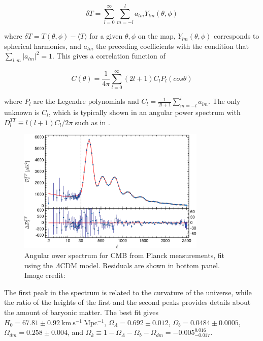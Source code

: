 \begin{equation}
\delta T = \sum\limits_{l=0}^{\infty} \sum\limits_{m=-l}^{l} a_{lm}Y_{lm}(\theta, \phi)
\end{equation}

\noindent where $\delta T = T(\theta, \phi) - \langle T \rangle$ for a given $\theta , \phi$
on the map, $Y_{lm}(\theta, \phi)$ corresponds to spherical harmonics, and $a_{lm}$ the preceding coefficients
with the condition that $\sum\limits_{l,m} |a_{lm}|^{2} = 1$.  This gives a correlation function of

\begin{equation}
C(\theta) = \frac{1}{4 \pi} \sum\limits_{l=0}^{\infty} (2l + 1) C_{l} P_{l}(cos \theta)
\end{equation}

\noindent where $P_{l}$ are the Legendre polynomials and $C_{l} = \frac{1}{2l + 1} \sum\limits_{m=-l}^{l} a_{lm}$.  The
only unknown is $C_{l}$, which is typically shown in an angular power spectrum with
$D_{l}^{TT} \equiv l(l+1)C_{l}/2\pi$ such as in .

\begin{figure}
	\includegraphics[width=0.8\textwidth]{cmb_power_spectrum}
	\centering
	\caption{Angular ower spectrum for CMB from Planck measurements, fit using the $\Lambda$CDM model.  Residuals
	are shown in bottom panel.  Image credit: }
	\label{fig:cmb_power_spectrum}
\end{figure}

The first peak in the spectrum is related to the curvature of the universe, while the ratio of the heights of the
first and the second peaks provides details about the amount of baryonic matter.  The best fit gives
$H_{0} = 67.81 \pm 0.92\ \mathrm{km\ s^{-1}\ Mpc^{-1}}$, $\Omega_{\Lambda} = 0.692 \pm 0.012$,
$\Omega_{b} = 0.0484 \pm 0.0005$, $\Omega_{dm} = 0.258 \pm 0.004$, and
$\Omega_{k} \equiv 1 - \Omega_{\Lambda} - \Omega_{b} - \Omega_{dm} =  -0.005_{-0.017}^{0.016}$.


